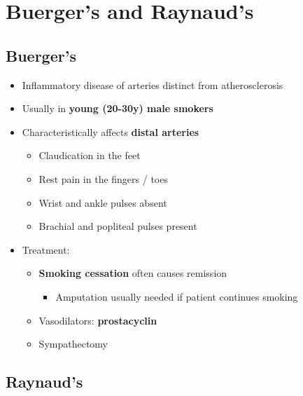 \documentclass[
  12pt,
]{memoir}
\providecommand{\tightlist}{%
  \setlength{\itemsep}{0pt}\setlength{\parskip}{0pt}}
\begin{document}
\hypertarget{buergers-and-raynauds}{%
\section{Buerger's and Raynaud's}\label{buergers-and-raynauds}}

\hypertarget{buergers}{%
\subsection{Buerger's}\label{buergers}}

\begin{itemize}
\tightlist
\item
  Inflammatory disease of arteries distinct from atherosclerosis
\item
  Usually in \textbf{young (20-30y) male smokers}
\item
  Characteristically affects \textbf{distal arteries}

  \begin{itemize}
  \tightlist
  \item
    Claudication in the feet
  \item
    Rest pain in the fingers / toes
  \item
    Wrist and ankle pulses absent
  \item
    Brachial and popliteal pulses present
  \end{itemize}
\item
  Treatment:

  \begin{itemize}
  \tightlist
  \item
    \textbf{Smoking cessation} often causes remission

    \begin{itemize}
    \tightlist
    \item
      Amputation usually needed if patient continues smoking
    \end{itemize}
  \item
    Vasodilators: \textbf{prostacyclin}
  \item
    Sympathectomy
  \end{itemize}
\end{itemize}

\hypertarget{raynauds}{%
\subsection{Raynaud's}\label{raynauds}}
\end{document}
